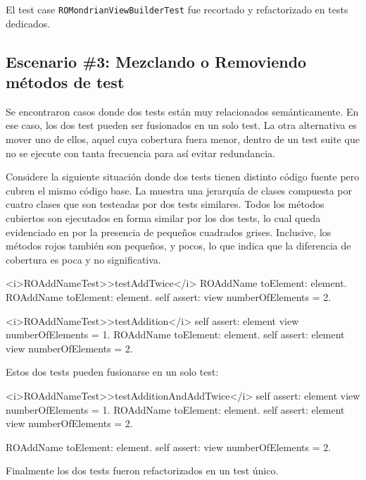 \par El test case {\tt ROMondrianViewBuilderTest} fue recortado y refactorizado en tests dedicados.

\subsection{Escenario \#3: Mezclando o Removiendo métodos de test}

\par Se encontraron casos donde dos tests están muy relacionados semánticamente. En ese caso, los dos test pueden ser fusionados en un solo test. La otra alternativa es mover uno de ellos, aquel cuya cobertura fuera menor, dentro de un test suite que no se ejecute con tanta frecuencia para así evitar redundancia.


\par Considere la siguiente situación donde dos tests tienen distinto código fuente pero cubren el mismo código base. La  muestra una jerarquía de clases compuesta por cuatro clases que son testeadas por dos tests similares. Todos los métodos cubiertos son ejecutados en forma similar por los dos tests, lo cual queda evidenciado en por la presencia de pequeños cuadrados grises. Inclusive, los métodos rojos también son pequeños, y pocos, lo que indica que la diferencia de cobertura es poca y no significativa.%


\begin{codeWithLineNumbers}
<i>ROAddNameTest>>testAddTwice</i>
	ROAddName toElement: element.
	ROAddName toElement: element.
	self assert: view numberOfElements = 2.
		
<i>ROAddNameTest>>testAddition</i>
	self assert: element view numberOfElements = 1.
	ROAddName toElement: element.
	self assert: element view numberOfElements = 2.	 
\end{codeWithLineNumbers}

\par Estos dos tests pueden fusionarse en un solo test: 

\begin{codeWithLineNumbers}
<i>ROAddNameTest>>testAdditionAndAddTwice</i>
	self assert: element view numberOfElements = 1.
	ROAddName toElement: element.
	self assert: element view numberOfElements = 2.

	ROAddName toElement: element.	
	self assert: view numberOfElements = 2.

\end{codeWithLineNumbers}

\par Finalmente los dos tests fueron refactorizados en un test único.


